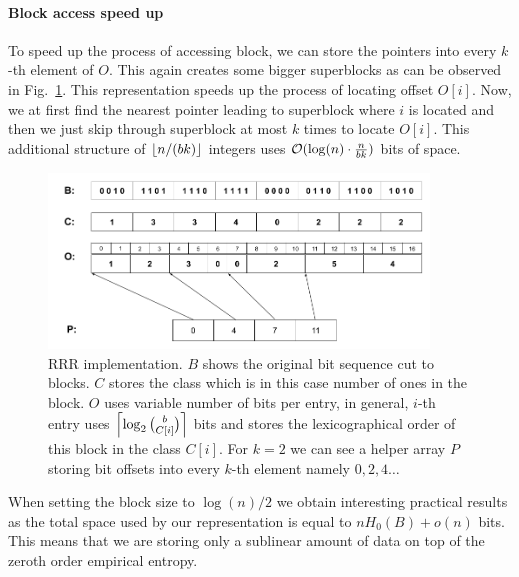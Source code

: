 \paragraph{Block access speed up}

To speed up the process of accessing block, we can store the pointers into every $k$-th element
of $O$. This again creates some bigger superblocks as can be observed in Fig.~\ref{obr:RRRFinal}.
This representation speeds up the process of locating offset $O[i]$. Now, we at first find the
nearest pointer leading to superblock where $i$ is located and then we just skip through superblock
at most $k$ times to locate $O[i]$. This additional structure of $\left\lfloor n/(bk) \right\rfloor$ integers uses
$\mathcal{O}(\log(n)\cdot \frac{n}{bk})$ bits of space.

\begin{figure}
	\centerline{
		\includegraphics[width=0.9\textwidth, height=0.3\textheight]{images/rrr}
	}
	\caption[TODO]{RRR implementation. $B$ shows the original bit sequence cut to
    blocks. $C$ stores the class which is in this case number of ones in the block.
    $O$ uses variable number of bits per entry, in general, $i$-th entry uses
    $\left\lceil \log_2{b\choose C[i]} \right\rceil$ bits and stores the lexicographical order
    of this block in the class $C[i]$. For $k=2$ we can see a helper array $P$
    storing bit offsets into every $k$-th element namely $0, 2, 4\ldots$
	}
	\label{obr:RRRFinal}
\end{figure}

When setting the block size to $\log(n)/2$ we obtain interesting practical results as
the total space used by our representation is equal to $nH_0(B) + o(n)$ bits. This means
that we are storing only a sublinear amount of data on top of the zeroth order empirical entropy.

